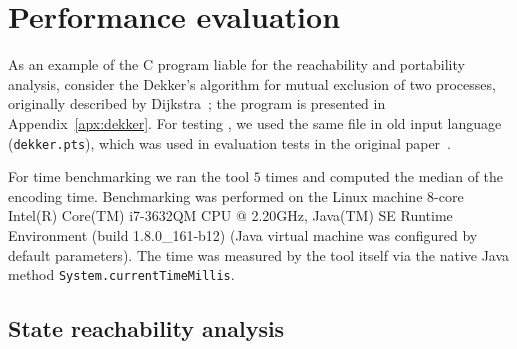 %




\section{Performance evaluation}
\label{ch:eval:perf}

As an example of the C program liable for the reachability and portability analysis, consider the Dekker's algorithm for mutual exclusion of two processes, originally described by Dijkstra~\cite{dijkstra1962over}; the program is presented in Appendix~\ref{apx:dekker}.
For testing \porthos[1], we used the same file in old \porthos{} input language (\texttt{dekker.pts}), which was used in evaluation tests in the original paper~\cite{Porthos17a}.

For time benchmarking we ran the tool $5$ times and computed the median of the encoding time.
Benchmarking was performed on the Linux machine 8-core Intel(R) Core(TM) i7-3632QM CPU @ 2.20GHz, Java(TM) SE Runtime Environment (build 1.8.0\_161-b12) (Java virtual machine was configured by default parameters).
The time was measured by the tool itself via the native Java method \texttt{System.currentTimeMillis}.

\subsection{State reachability analysis}
\label{ch:eval:perf:reach}


